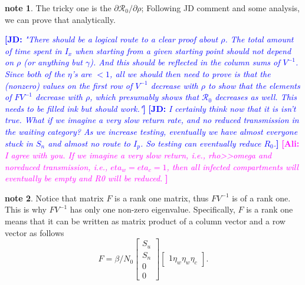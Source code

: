 \documentclass[12pt]{article}
\newcommand{\comment}{\showcomment}
\newcommand{\showcomment}[3]{\textcolor{#1}{\textbf{[#2: }\textsl{#3}\textbf{]}}}
\newcommand{\ali}[1]{\comment{magenta}{Ali}{#1}}
\newcommand{\jd}[1]{\comment{blue}{JD}{#1}}
\newcommand{\Rnum}{\mathcal{R}_0}
\theoremstyle{definition} %
\newtheorem{note}{note}
\begin{document}
\begin{note} The tricky one is the $\partial{\Rnum}/\partial{\rho}$; Following JD comment and some analysis, we can prove that analytically.
\end{note}

\jd{"There should be a logical route to a clear proof about $\rho$. The total
amount of time spent in $I_x$ when starting from a given starting point should not depend on $\rho$ (or anything but $\gamma$). And this should be reflected in the column sums of $V^{-1}$.
Since both of the $\eta$'s are $<1$, all we should then need to prove is that the (nonzero) values on the first row of $V^{-1}$ decrease with $\rho$ to show that the elements of $FV^{-1}$ decrease with $\rho$, which presumably shows that $\Rnum$ decreases as well. This needs to be filled ink but should work."}
\jd{I certainly think now that it is isn't true. What if we imagine a very
slow return rate, and no reduced transmission in the waiting category?
As we increase testing, eventually we have almost everyone stuck in
$S_n$ and almost no route to $I_p$. So testing can eventually reduce $R_0$.}
\ali{I agree with you. If we imagine a very slow return, i.e., rho>>omega and noreduced transmission, i.e., $eta_w=eta_c=1$, then all infected compartments will eventually be empty and R0 will be reduced. }

\begin{note}
\label{note:rankf}
Notice that matrix $F$ is a rank one matrix, thus $FV^{-1}$ is of a rank one. This is why $FV^{-1}$ has only one non-zero eigenvalue. Specifically, $F$ is a rank one means that it can be written as matrix product of a column vector and a row vector as follows
$$
F = \beta/N_0 \left[\begin{array}{c} S_u\\  S_n\\ 0\\ 0 \end {array} \right]
\left[\begin{array}{cccc} 1 \eta_w \eta_w \eta_c \end {array} \right].
$$
\end{note}
\end{document}
